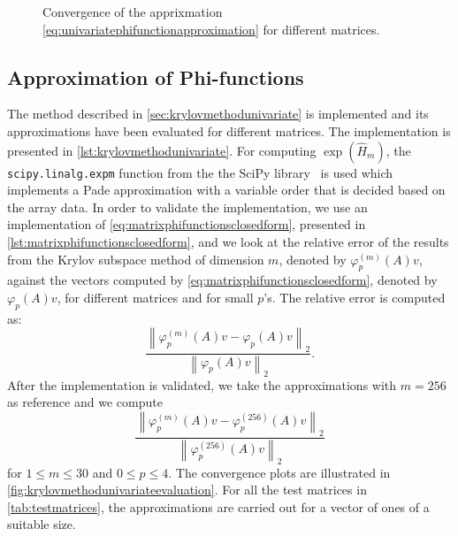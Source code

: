 \begin{figure}[h!]
    \caption{Convergence of the apprixmation \eqref{eq:univariatephifunctionapproximation} for different matrices.}
    \label{fig:krylovmethodunivariateevaluation}
\end{figure}


\subsection{Approximation of Phi-functions}
The method described in \autoref{sec:krylovmethodunivariate} is implemented and its approximations have been evaluated
for different matrices. The implementation is presented in \autoref{lst:krylovmethodunivariate}.
For computing $\exp(\hat{H}_m)$, the \texttt{scipy.linalg.expm} function from the the SciPy library~\cite{SciPy2020}
is used which implements a Pade approximation with a variable order that is decided based on the array data.
In order to validate the implementation, we use an implementation of \eqref{eq:matrixphifunctionsclosedform}, presented in
\autoref{lst:matrixphifunctionsclosedform}, and we look at the relative error of the results from the Krylov subspace
method of dimension $m$, denoted by $\varphi_p^{(m)}(A)v$, against the vectors computed by \eqref{eq:matrixphifunctionsclosedform},
denoted by $\varphi_p(A)v$, for different matrices and for small $p$'s. The relative error is computed as:
\begin{equation*}
    \frac{\left\| \varphi_p^{(m)}(A)v - \varphi_p(A)v \right\|_2}{\left\| \varphi_p(A)v\right\|_2}.
\end{equation*}
After the implementation is validated, we take the approximations with $m=256$ as reference and we compute
\begin{equation*}
    \frac{\left\| \varphi_p^{(m)}(A)v - \varphi_p^{(256)}(A)v \right\|_2}{\left\| \varphi_p^{(256)}(A)v\right\|_2}
\end{equation*}
for $1 \le m \le 30$ and $0 \le p \le 4$. The convergence plots are illustrated in \autoref{fig:krylovmethodunivariateevaluation}.
For all the test matrices in \autoref{tab:testmatrices}, the approximations are carried out for a vector of ones of a suitable
size.

